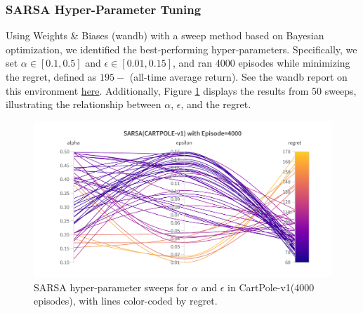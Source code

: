 \documentclass[11pt, a4]{article}
\begin{document}
			\subsubsection{SARSA Hyper-Parameter Tuning}  
			Using Weights \& Biases (wandb) with a sweep method based on Bayesian optimization, we identified the best-performing hyper-parameters. Specifically, we set $\alpha \in [0.1, 0.5]$ and $\epsilon \in [0.01, 0.15]$, and ran 4000 episodes while minimizing the regret, defined as \(195 -\) (all-time average return). See the wandb report on this environment \href{https://api.wandb.ai/links/ee24e009-iitm/0hseqrps}{here}. Additionally, Figure \ref{fig:sarsacartpole-regret} displays the results from 50 sweeps, illustrating the relationship between $\alpha$, $\epsilon$, and the regret.
				\begin{figure}[H]
					\centering
					\includegraphics[width=1\linewidth]{sarsa-hyp-tuning-cartpole.png}
					\caption{SARSA hyper-parameter sweeps for $\alpha$ and $\epsilon$ in CartPole-v1(4000 episodes), with lines color-coded by regret.}
					\label{fig:sarsacartpole-regret}
				\end{figure}
\end{document}
